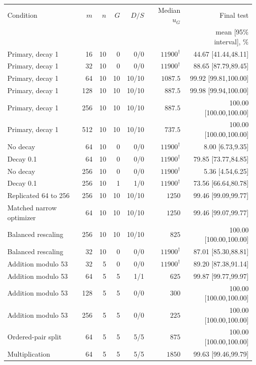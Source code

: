 \begin{tabular}{lrrrrrr}
\toprule
Condition & $m$ & $n$ & $G$ & $D/S$ & Median $u_G$ & Final test \\
 & & & & & & mean [95\% interval], \% \\
\midrule
Primary, decay 1 & 16 & 10 & 0 & 0/0 & $11900^{\dagger}$ & 44.67 [41.44,48.11] \\
Primary, decay 1 & 32 & 10 & 0 & 0/0 & $11900^{\dagger}$ & 88.65 [87.79,89.45] \\
Primary, decay 1 & 64 & 10 & 10 & 10/10 & $1087.5$ & 99.92 [99.81,100.00] \\
Primary, decay 1 & 128 & 10 & 10 & 10/10 & $887.5$ & 99.98 [99.94,100.00] \\
Primary, decay 1 & 256 & 10 & 10 & 10/10 & $887.5$ & 100.00 [100.00,100.00] \\
Primary, decay 1 & 512 & 10 & 10 & 10/10 & $737.5$ & 100.00 [100.00,100.00] \\
No decay & 64 & 10 & 0 & 0/0 & $11900^{\dagger}$ & 8.00 [6.73,9.35] \\
Decay 0.1 & 64 & 10 & 0 & 0/0 & $11900^{\dagger}$ & 79.85 [73.77,84.85] \\
No decay & 256 & 10 & 0 & 0/0 & $11900^{\dagger}$ & 5.36 [4.54,6.25] \\
Decay 0.1 & 256 & 10 & 1 & 1/0 & $11900^{\dagger}$ & 73.56 [66.64,80.78] \\
Replicated 64 to 256 & 256 & 10 & 10 & 10/10 & $1250$ & 99.46 [99.09,99.77] \\
Matched narrow optimizer & 64 & 10 & 10 & 10/10 & $1250$ & 99.46 [99.07,99.77] \\
Balanced rescaling & 256 & 10 & 10 & 10/10 & $825$ & 100.00 [100.00,100.00] \\
Balanced rescaling & 32 & 10 & 0 & 0/0 & $11900^{\dagger}$ & 87.01 [85.30,88.81] \\
Addition modulo 53 & 32 & 5 & 0 & 0/0 & $11900^{\dagger}$ & 89.20 [87.38,91.14] \\
Addition modulo 53 & 64 & 5 & 5 & 1/1 & $625$ & 99.87 [99.77,99.97] \\
Addition modulo 53 & 128 & 5 & 5 & 0/0 & $300$ & 100.00 [100.00,100.00] \\
Addition modulo 53 & 256 & 5 & 5 & 0/0 & $225$ & 100.00 [100.00,100.00] \\
Ordered-pair split & 64 & 5 & 5 & 5/5 & $875$ & 100.00 [100.00,100.00] \\
Multiplication & 64 & 5 & 5 & 5/5 & $1850$ & 99.63 [99.46,99.79] \\

\end{tabular}
